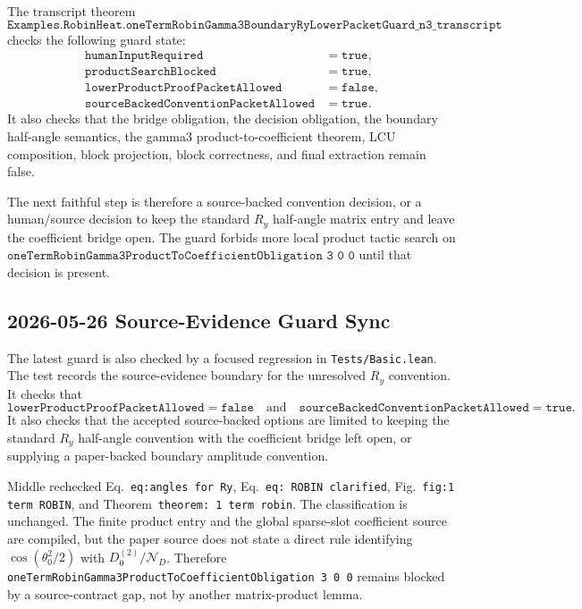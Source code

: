 The transcript theorem
\[
  \texttt{Examples.RobinHeat.oneTermRobinGamma3BoundaryRyLowerPacketGuard\_n3\_transcript}
\]
checks the following guard state:
\[
\begin{aligned}
  \texttt{humanInputRequired} &= \texttt{true},\\
  \texttt{productSearchBlocked} &= \texttt{true},\\
  \texttt{lowerProductProofPacketAllowed} &= \texttt{false},\\
  \texttt{sourceBackedConventionPacketAllowed} &= \texttt{true}.
\end{aligned}
\]
It also checks that the bridge obligation, the decision obligation, the
boundary half-angle semantics, the gamma3 product-to-coefficient theorem, LCU
composition, block projection, block correctness, and final extraction remain
false.

The next faithful step is therefore a source-backed convention decision, or a
human/source decision to keep the standard \(R_y\) half-angle matrix entry and
leave the coefficient bridge open.  The guard forbids more local product
tactic search on
\(\texttt{oneTermRobinGamma3ProductToCoefficientObligation 3 0 0}\) until that
decision is present.

\subsection{2026-05-26 Source-Evidence Guard Sync}

The latest guard is also checked by a focused regression in
\texttt{Tests/Basic.lean}.  The test records the source-evidence boundary for
the unresolved \(R_y\) convention.  It checks that
\[
  \texttt{lowerProductProofPacketAllowed}=\texttt{false}
  \quad\text{and}\quad
  \texttt{sourceBackedConventionPacketAllowed}=\texttt{true}.
\]
It also checks that the accepted source-backed options are limited to keeping
the standard \(R_y\) half-angle convention with the coefficient bridge left
open, or supplying a paper-backed boundary amplitude convention.

Middle rechecked Eq.~\texttt{eq:angles for Ry}, Eq.~\texttt{eq: ROBIN
clarified}, Fig.~\texttt{fig:1 term ROBIN}, and
Theorem~\texttt{theorem: 1 term robin}.  The classification is unchanged.
The finite product entry and the global sparse-slot coefficient source are
compiled, but the paper source does not state a direct rule identifying
\(\cos(\theta_0^2/2)\) with \(D_0^{(2)}/\mathcal{N}_D\).  Therefore
\texttt{oneTermRobinGamma3ProductToCoefficientObligation 3 0 0} remains
blocked by a source-contract gap, not by another matrix-product lemma.

